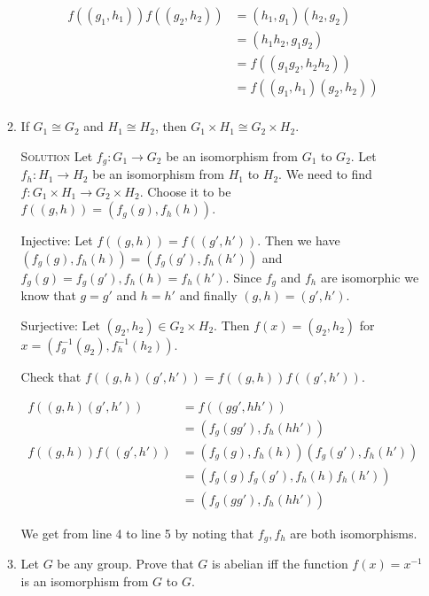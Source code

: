 \documentclass[twoside]{amsart}
\newcommand{\solution}{\textsc{Solution}\xspace}
\newcommand{\iso}{\cong}
\newcommand{\blank}{\vspace{5pt}}
\begin{document}
\begin{enumerate}[A.]
\begin{enumerate}[1]
      \begin{align*}
         f((g_1,h_1))f((g_2,h_2)) &= (h_1,g_1)(h_2,g_2) \\
                                  &= (h_1h_2,g_1g_2) \\
                                  &= f((g_1g_2,h_2h_2)) \\
                                  &= f((g_1,h_1)(g_2,h_2))\\
      \end{align*}

      \blank
      \item If $G_1 \iso G_2$ and $H_1 \iso H_2$, then $G_1 \times H_1
      \iso G_2 \times H_2$.

      \blank \noindent \solution 
      Let $f_g : G_1 \to G_2$ be an isomorphism from $G_1$ to $G_2$.
      Let $f_h : H_1 \to H_2$ be an isomorphism from $H_1$ to $H_2$.
      We need to find $f : G_1 \times H_1 \to G_2 \times H_2$.
      Choose it to be $f((g,h)) = (f_g(g),f_h(h))$.

      Injective: Let $f((g,h))=f((g',h'))$. Then we have 
      $(f_g(g),f_h(h)) = (f_g(g'),f_h(h'))$ and $f_g(g)=f_g(g'), 
      f_h(h)=f_h(h')$. Since $f_g$ and $f_h$
      are isomorphic we know that $g=g'$ and $h=h'$ and finally
      $(g,h)=(g',h')$. 

      Surjective: Let $(g_2,h_2) \in G_2 \times H_2$. Then
      $f(x) = (g_2,h_2)$ for $x = (f^{-1}_g(g_2),f^{-1}_h(h_2))$.

      Check that $f((g,h)(g',h')) = f((g,h))f((g',h'))$.

      \setcounter{equation}{0}
      \begin{align}
         f((g,h)(g',h')) &= f((gg',hh')) \\
                         &= (f_g(gg'),f_h(hh')) \\
         f((g,h))f((g',h')) &= (f_g(g),f_h(h))(f_g(g'),f_h(h')) \\
                            &= (f_g(g)f_g(g'),f_h(h)f_h(h')) \\
                            &= (f_g(gg'),f_h(hh'))
      \end{align}

      We get from line 4 to line 5 by noting that $f_g, f_h$ are both
      isomorphisms.
      

      \item Let $G$ be any group. Prove that $G$ is abelian iff the
      function $f(x) = x^{-1}$ is an isomorphism from $G$ to $G$.


\end{enumerate}
\end{enumerate}
\end{document}
